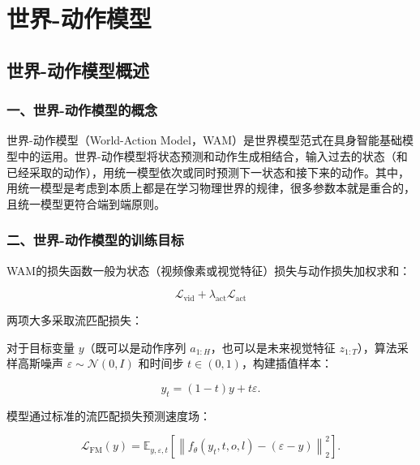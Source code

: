 \hypertarget{ux4e16ux754c-ux52a8ux4f5cux6a21ux578b}{%
\chapter{世界-动作模型}\label{ux4e16ux754c-ux52a8ux4f5cux6a21ux578b}}

\hypertarget{ux4e16ux754c-ux52a8ux4f5cux6a21ux578bux6982ux8ff0}{%
\section{世界-动作模型概述}\label{ux4e16ux754c-ux52a8ux4f5cux6a21ux578bux6982ux8ff0}}

\hypertarget{ux4e00ux4e16ux754c-ux52a8ux4f5cux6a21ux578bux7684ux6982ux5ff5}{%
\subsection{一、世界-动作模型的概念}\label{ux4e00ux4e16ux754c-ux52a8ux4f5cux6a21ux578bux7684ux6982ux5ff5}}

世界-动作模型（World-Action Model，WAM）是世界模型范式在具身智能基础模型中的运用。世界-动作模型将状态预测和动作生成相结合，输入过去的状态（和已经采取的动作），用统一模型依次或同时预测下一状态和接下来的动作。其中，用统一模型是考虑到本质上都是在学习物理世界的规律，很多参数本就是重合的，且统一模型更符合端到端原则。

\hypertarget{ux4e8cux4e16ux754c-ux52a8ux4f5cux6a21ux578bux7684ux8badux7ec3ux76eeux6807}{%
\subsection{二、世界-动作模型的训练目标}\label{ux4e8cux4e16ux754c-ux52a8ux4f5cux6a21ux578bux7684ux8badux7ec3ux76eeux6807}}

WAM的损失函数一般为状态（视频像素或视觉特征）损失与动作损失加权求和：

\[
\mathcal{L}_{\mathrm{vid}}+\lambda_{\mathrm{act}}\mathcal{L}_{\mathrm{act}}
\]

两项大多采取流匹配损失：

对于目标变量 \(y\)（既可以是动作序列 \(a_{1:H}\)，也可以是未来视觉特征 \(z_{1:T}\)），算法采样高斯噪声 \(\varepsilon\sim\mathcal{N}(0,I)\) 和时间步 \(t\in(0,1)\)，构建插值样本：

\[
y_t=(1-t)y+t\varepsilon.
\]

模型通过标准的流匹配损失预测速度场：

\[
\mathcal{L}_{\mathrm{FM}}(y)=\mathbb{E}_{y,\varepsilon,t}\left[\left\|f_\theta(y_t,t,o,l)-(\varepsilon-y)\right\|_2^2\right].
\]

